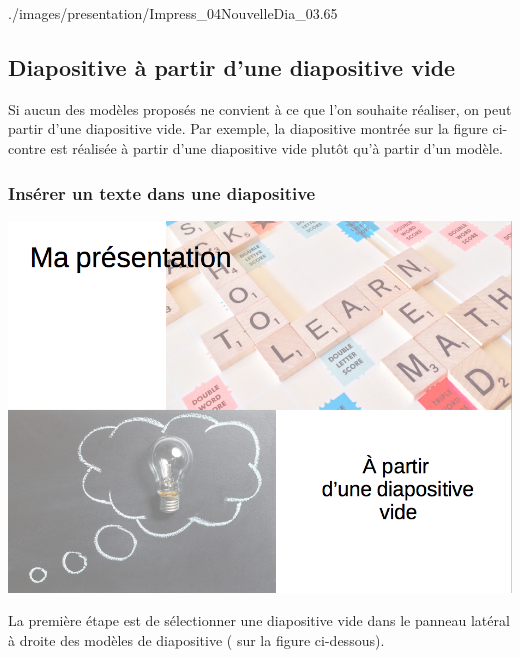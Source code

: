 	      {./images/presentation/Impress_04NouvelleDia_03}{.65\textwidth}





\subsection{Diapositive à partir d'une diapositive vide}\label{Presentation1DiapoSansModele}


\begin{minipage}[c]{.58\textwidth}
Si aucun des modèles proposés ne convient à ce que l'on souhaite réaliser, on peut partir d'une diapositive vide. Par exemple, la diapositive montrée sur la figure ci-contre est réalisée à partir d'une diapositive vide plutôt qu'à partir d'un modèle.

\subsubsection{Insérer un texte dans une diapositive}\label{Presentation1texte}
\end{minipage}\hfill%
\begin{minipage}[c]{.38\textwidth}
\centering%
\includegraphics[angle=0,width=.75\textwidth]{./images/presentation/Impress_07DiaSansFormat_10}
\end{minipage}

\vspace{1em}


La première étape est de sélectionner une diapositive vide dans le panneau latéral à droite des modèles de diapositive ( sur la figure ci-dessous).

